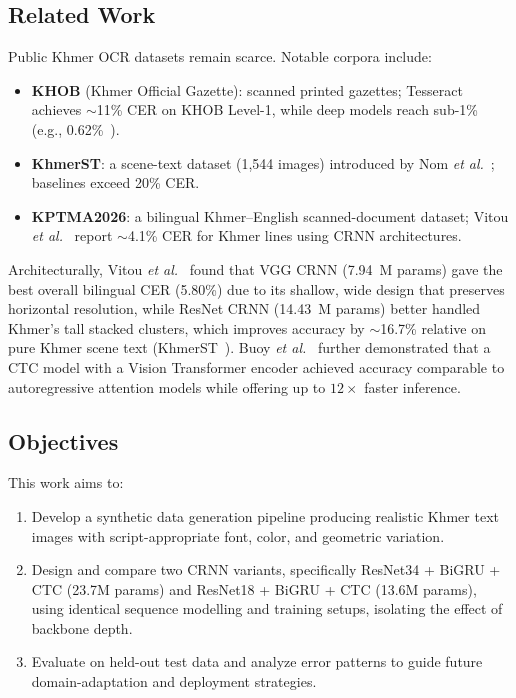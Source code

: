 \documentclass[conference]{IEEEtran}
\begin{document}
\subsection{Related Work}

Public Khmer OCR datasets remain scarce. Notable corpora include:
\begin{itemize}
  \item \textbf{KHOB} (Khmer Official Gazette): scanned printed gazettes;
        Tesseract achieves $\sim$11\% CER on KHOB Level-1, while deep models
        reach sub-1\% (e.g., 0.62\%~\cite{buoy2023}).
  \item \textbf{KhmerST}: a scene-text dataset (1,544 images) introduced by
        Nom \emph{et al.}~\cite{nom2024}; baselines exceed 20\% CER.
  \item \textbf{KPTMA2026}: a bilingual Khmer--English scanned-document dataset;
        Vitou \emph{et al.}~\cite{vitou2026} report $\sim$4.1\% CER for Khmer
        lines using CRNN architectures.
\end{itemize}

Architecturally, Vitou \emph{et al.}~\cite{vitou2026} found that VGG CRNN
(7.94~M params) gave the best overall bilingual CER (5.80\%) due to its shallow,
wide design that preserves horizontal resolution, while ResNet CRNN
(14.43~M params) better handled Khmer's tall stacked clusters, which improves
accuracy by $\sim$16.7\% relative on pure Khmer scene text (KhmerST~\cite{nom2024}).
Buoy \emph{et al.}~\cite{buoy2023} further demonstrated that a CTC model with a
Vision Transformer encoder achieved accuracy comparable to autoregressive
attention models while offering up to $12\times$ faster inference.

\subsection{Objectives}

This work aims to:
\begin{enumerate}
  \item Develop a synthetic data generation pipeline producing realistic Khmer
        text images with script-appropriate font, color, and geometric variation.
  \item Design and compare two CRNN variants, specifically ResNet34 + BiGRU + CTC
        (23.7M params) and ResNet18 + BiGRU + CTC (13.6M params), using
        identical sequence modelling and training setups, isolating the effect
        of backbone depth.
  \item Evaluate on held-out test data and analyze error patterns to guide
        future domain-adaptation and deployment strategies.
\end{enumerate}
\end{document}
